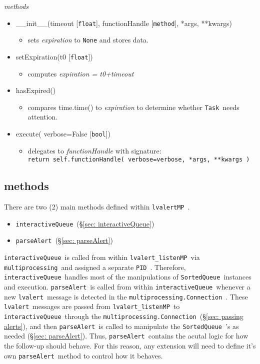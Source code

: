 \documentclass{article}
\newcommand{\PID}{\texttt{PID}~}
\newcommand{\multiprocessing}{\texttt{multiprocessing}~}
\newcommand{\multiprocessingConnection}{\texttt{multiprocessing.Connection}~}
\newcommand{\alert}{\texttt{lvalert}~}
\newcommand{\lvalertMP}{\texttt{lvalertMP}~}
\newcommand{\lvalertListenMP}{\texttt{lvalert\_listenMP}~}
\newcommand{\interactiveQueue}{\texttt{interactiveQueue}~}
\newcommand{\parseAlert}{\texttt{parseAlert}~}
\newcommand{\SortedQueue}{\texttt{SortedQueue}~}
\newcommand{\Task}{\texttt{Task}~}
\begin{document}
\noindent
\textit{methods}

\begin{itemize}
    \item{\_\_init\_\_(timeout [\texttt{float}], functionHandle [\texttt{method}], *args, **kwargs)
        \begin{itemize}
            \item{sets \textit{expiration} to \texttt{None} and stores data.}
        \end{itemize}
         }
    \item{setExpiration(t0 [\texttt{float}])
        \begin{itemize}
            \item{computes \textit{expiration = t0+timeout}}
        \end{itemize}
         }
    \item{hasExpired()
        \begin{itemize}
            \item{compares time.time() to \textit{expiration} to determine whether \Task needs attention.}
        \end{itemize}
         }
    \item{execute( verbose=False [\texttt{bool}])
        \begin{itemize}
            \item{delegates to \textit{functionHandle} with signature: \\ \texttt{return self.functionHandle( verbose=verbose, *args, **kwargs )}}
        \end{itemize}
         }
\end{itemize}


\subsection{methods}
\label{sec: methods}

There are two (2) main methods defined within \lvalertMP. 
\begin{itemize}
    \item{\interactiveQueue (\S\ref{sec: interactiveQueue})}
    \item{\parseAlert (\S\ref{sec: parseAlert})}
\end{itemize}
\interactiveQueue is called from within \lvalertListenMP via \multiprocessing and assigned a separate \PID.
Therefore, \interactiveQueue handles most of the manipulations of \SortedQueue instances and execution.
\parseAlert is called from within \interactiveQueue whenever a new \alert message is detected in the \multiprocessingConnection.
These \alert messages are passed from \lvalertListenMP to \interactiveQueue through the \multiprocessingConnection (\S\ref{sec: passing alerts}), and then \parseAlert is called to manipulate the \SortedQueue's as needed (\S\ref{sec: parseAlert}).
Thus, \parseAlert contains the acutal logic for how the follow-up should behave.
For this reason, any extension will need to define it's own \parseAlert method to control how it behaves.
\end{document}

